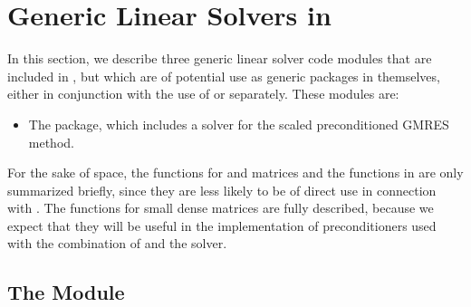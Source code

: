\chapter{Generic Linear Solvers in {\sundials}}\label{s:gen_linsolv}
In this section, we describe three generic linear solver code modules that 
are included in {\sundials}, but which are of potential use as generic packages in
themselves, either in conjunction with the use of {\kinsol} or separately.
These modules are:
\begin{itemize}
\item The {\spgmr} package, which includes a solver for the scaled
      preconditioned GMRES method.
\end{itemize}

For the sake of space, the functions for  and
 matrices and the functions in {\spgmr} are only summarized
briefly, since they are less likely to be of direct use in connection
with {\kinsol}.  The functions for small dense matrices are fully
described, because we expect that they will be useful in the
implementation of preconditioners used with the combination of {\kinsol}
and the {\kinspgmr} solver.



\section{The {\spgmr} Module}\label{ss:spgmr}


